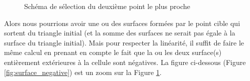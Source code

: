 \begin{figure}[H]
    \centering
    \caption{Schéma de sélection du deuxième point le plus proche}
    \label{fig:deux_pt}
\end{figure}


Alors nous pourrions avoir une ou des surfaces formées par le point cible qui sortent du triangle initial (et la somme des surfaces ne serait pas égale à la surface du triangle initial). Mais pour respecter la linéarité, il suffit de faire le même calcul en prenant en compte le fait que la ou les deux surface(s) entièrement extérieures à la cellule sont négatives. La figure ci-dessous (Figure \ref{fig:surface_negative}) est un zoom sur la Figure \ref{fig:deux_pt}.


